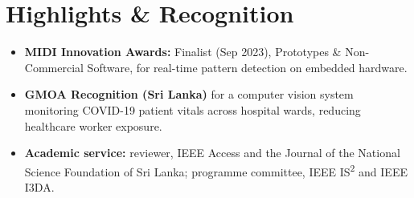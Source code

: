 \documentclass[11pt]{article}
\begin{document}
\enlargethispage{3\baselineskip}
\vspace{-0.5em}
\section*{Highlights \& Recognition}
\begin{itemize}[leftmargin=1.2em, itemsep=-0.25em]
    \item \textbf{MIDI Innovation Awards:} Finalist (Sep 2023), Prototypes \& Non-Commercial Software, for real-time pattern detection on embedded hardware.
    \item \textbf{GMOA Recognition (Sri Lanka)} for a computer vision system monitoring COVID-19 patient vitals across hospital wards, reducing healthcare worker exposure.
    \item \textbf{Academic service:} reviewer, IEEE Access and the Journal of the National Science Foundation of Sri Lanka; programme committee, IEEE IS\textsuperscript{2} and IEEE I3DA.
\end{itemize}
\end{document}
